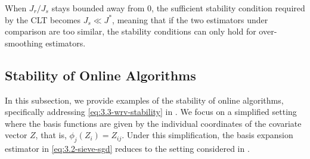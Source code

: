 \documentclass[11pt]{article}
\theoremstyle{plain}
\newcommand{\D}{{\mathcal{D}}}
\begin{document}
When $J_r/J_s$ stays bounded away from $0$, the sufficient stability condition required by the CLT becomes $J_s\ll J^*$, meaning that if the two estimators under comparison are too similar, the stability conditions can only hold for over-smoothing estimators.







\subsection{Stability of Online Algorithms}\label{subsec:6.4-stab-online}

In this subsection, we provide examples of the stability of online algorithms, specifically addressing \eqref{eq:3.3-wrv-stability} in .
We focus on a simplified setting where the basis functions are given by the individual coordinates of the covariate vector $Z$, that is, $\phi_j(Z_i) = Z_{ij}$. Under this simplification, the basis expansion estimator in \eqref{eq:3.2-sieve-sgd} reduces to the setting considered in .
\end{document}
